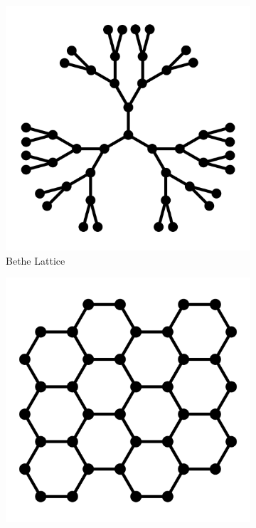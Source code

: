 \begin{figure}[p]
  \centering
  \begin{subfigure}[b]{0.45\textwidth}
    \centering
    \includegraphics[width=\textwidth]{2/Bethe}
    \caption{Bethe Lattice}
    \label{fig:bethe lattice}
  \end{subfigure}
  \hfill
  \begin{subfigure}[b]{0.45\textwidth}
    \centering
    \includegraphics[width=\textwidth]{2/Honeycomb}

\end{subfigure}
\end{figure}
